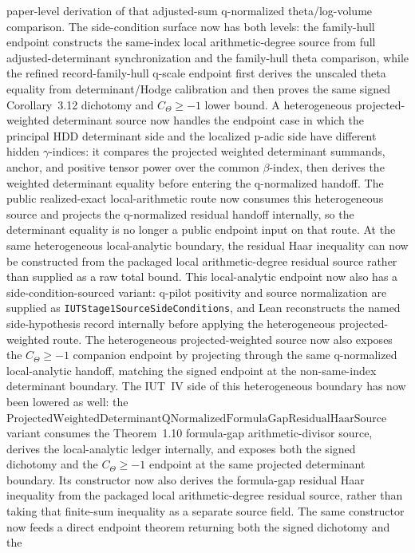\documentclass[11pt]{article}
\theoremstyle{plain}
\theoremstyle{definition}
\theoremstyle{remark}
\begin{document}
paper-level derivation of that adjusted-sum q-normalized theta/log-volume
comparison.  The
side-condition surface now has both levels: the family-hull endpoint constructs
the same-index local arithmetic-degree source from full adjusted-determinant
synchronization and the family-hull theta comparison, while the refined
record-family-hull q-scale endpoint first derives the unscaled theta equality
from determinant/Hodge calibration and then proves the same signed
Corollary~3.12 dichotomy and \(C_\Theta\geq -1\) lower bound.
A heterogeneous projected-weighted determinant source now handles the endpoint case in which
the principal HDD determinant side and the localized p-adic side have different
hidden \(\gamma\)-indices: it compares the projected weighted determinant
summands, anchor, and positive tensor power over the common \(\beta\)-index,
then derives the weighted determinant equality before entering the q-normalized
handoff.  The public realized-exact local-arithmetic route now consumes this
heterogeneous source and projects the q-normalized residual handoff internally,
so the determinant equality is no longer a public endpoint input on that route.
At the same heterogeneous local-analytic boundary, the residual Haar inequality
can now be constructed from the packaged local arithmetic-degree residual
source rather than supplied as a raw total bound.
This local-analytic endpoint now also has a side-condition-sourced variant:
q-pilot positivity and source normalization are supplied as
\texttt{IUTStage1SourceSideConditions}, and Lean reconstructs the named
side-hypothesis record internally before applying the heterogeneous
projected-weighted route.
The heterogeneous projected-weighted source now also exposes the
\(C_\Theta \geq -1\) companion endpoint by projecting through the same
q-normalized local-analytic handoff, matching the signed endpoint at the
non-same-index determinant boundary.  The IUT~IV side of this heterogeneous
boundary has now been lowered as well: the
\(\mathrm{ProjectedWeightedDeterminantQNormalizedFormulaGapResidualHaarSource}\)
variant consumes the Theorem~1.10 formula-gap arithmetic-divisor source, derives
the local-analytic ledger internally, and exposes both the signed dichotomy and
the \(C_\Theta \geq -1\) endpoint at the same projected determinant boundary.
Its constructor now also derives the formula-gap residual Haar inequality from
the packaged local arithmetic-degree residual source, rather than taking that
finite-sum inequality as a separate source field.  The same constructor now
feeds a direct endpoint theorem returning both the signed dichotomy and the
\end{document}
